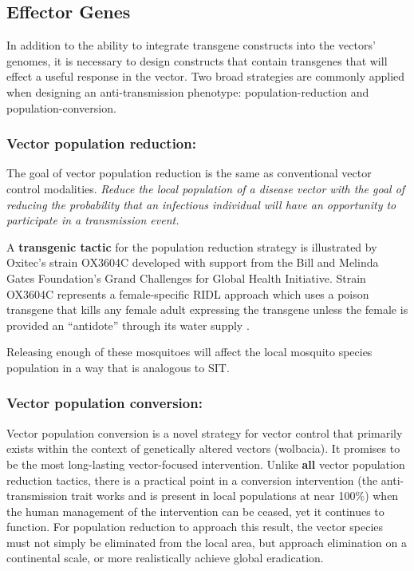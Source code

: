 \subsection{Effector Genes}

In addition to the ability to integrate transgene constructs into the vectors' genomes, it is necessary to design constructs that contain transgenes that will effect a useful response in the vector.
Two broad strategies are commonly applied when designing an anti-transmission phenotype: \gls{population-reduction} and \gls{population-conversion}.

\subsubsection{Vector population reduction:}

The goal of vector population reduction is the same as conventional vector control modalities.
\emph{Reduce the local population of a disease vector with the goal of reducing the probability that an infectious individual will have an opportunity to participate in a transmission event.}


A \textbf{transgenic tactic} for the population reduction strategy is illustrated by Oxitec's \Aa strain OX3604C developed with support from the Bill and Melinda Gates Foundation's Grand Challenges for Global Health Initiative.
Strain OX3604C represents a female-specific \gls{RIDL} approach which uses a poison transgene that kills any female adult expressing the transgene unless the female is provided an ``antidote'' through its water supply \cite{WisedeValdez2011,Bargielowski2012,Facchinelli2013}.

Releasing enough of these mosquitoes will affect the local mosquito species population in a way that is analogous to \gls{SIT}.

\subsubsection{Vector population conversion:}

Vector population conversion is a novel strategy for vector control that primarily exists within the context of genetically altered vectors (\CITEME wolbacia).
It promises to be the most long-lasting vector-focused intervention.
Unlike \textbf{all} vector population reduction tactics, there is a practical point in a conversion intervention (the anti-transmission trait works and is present in local populations at near 100\%) when the human management of the intervention can be ceased, yet it continues to function.
For population reduction to approach this result, the vector species must not simply be eliminated from the local area, but approach elimination on a continental scale, or more realistically achieve global eradication.

